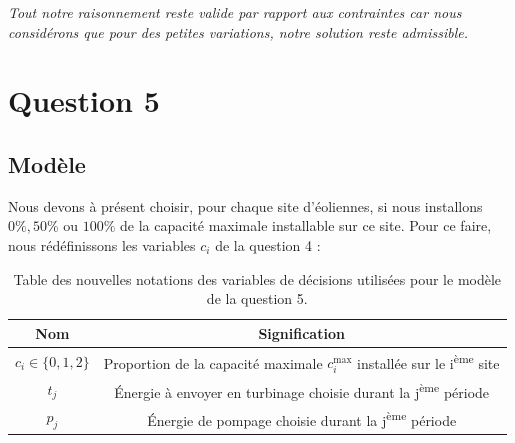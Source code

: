 \documentclass{article}
\begin{document}
\noindent \textit{Tout notre raisonnement reste valide par rapport aux contraintes car nous considérons que pour des petites variations, notre solution reste admissible.}

\newpage
\section*{Question 5}

\subsection*{Modèle}
Nous devons à présent choisir, pour chaque site d'éoliennes, si nous installons $0\%, 50\%$ ou $100\%$ de la capacité maximale installable sur ce site.
Pour ce faire, nous rédéfinissons les variables $c_i$ de la question 4 :

\begin{table}[h!]
    \centering
    \renewcommand{\arraystretch}{1.5}%
    \begin{tabular}{|c || c |} 
        \hline
        Nom & Signification\\
        \hline\hline
        $c_{i} \in \{ 0, 1, 2 \}$ & Proportion de la capacité maximale $c_i^\mathrm{max}$ installée sur le i\textsuperscript{ème} site\\
        $t_j$ & Énergie à envoyer en turbinage choisie durant la j\textsuperscript{ème} période\\
        $p_j$ & Énergie de pompage choisie durant la j\textsuperscript{ème} période\\
        \hline
    \end{tabular}
    \caption{Table des nouvelles notations des variables de décisions utilisées pour le modèle de la question 5.}
    \label{table:notations_variables_5}
\end{table} 
\end{document}
